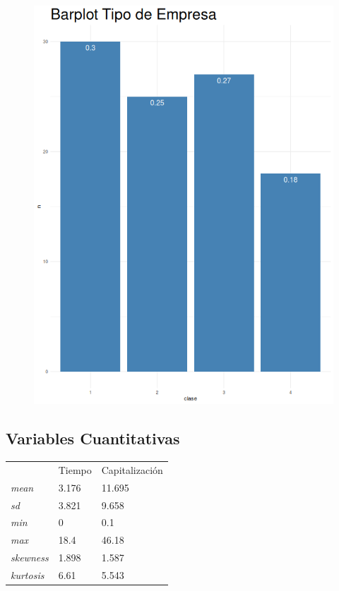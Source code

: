 \documentclass{article}
\begin{document}
\begin{center}
\begin{minipage}{0.6\linewidth}
\begin{minipage}{0.45\linewidth}
\begin{figure}[H]
                    \includegraphics[width=\linewidth]{../bar2.png}
                \end{figure} 
            \end{minipage}
        \end{minipage}
    \end{center}

    \subsection{Variables Cuantitativas}

    \begin{table}[H]
        \centering
        \begin{tabular}{lll}
            & Tiempo & Capitalizaci\'on \\ \cline{2-3} 
            \textit{mean}     & 3.176  & 11.695         \\
            \textit{sd}       & 3.821  & 9.658          \\
            \textit{min}      & 0      & 0.1            \\
            \textit{max}      & 18.4   & 46.18          \\
            \textit{skewness} & 1.898  & 1.587          \\
            \textit{kurtosis} & 6.61   & 5.543         
        \end{tabular}
    \end{table}
\end{document}
